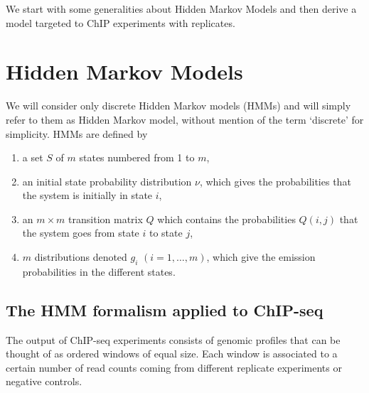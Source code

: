 \documentclass[12pt]{article}
\begin{document}
{}





\newpage
\begin{appendices}



We start with some generalities about Hidden Markov Models and then
derive a model targeted to ChIP experiments with replicates.

\section{Hidden Markov Models}

    We will consider only discrete Hidden Markov models (HMMs) and
    will simply refer to them as Hidden Markov model, without mention
    of the term `discrete' for simplicity.  HMMs are defined by

    \begin{enumerate}
      \item a set $S$ of $m$ states numbered from 1 to $m$,
      \item an initial state probability distribution $\nu$, which
      gives the probabilities that the system is initially in state $i$,
      \item an $m \times m$ transition matrix $Q$ which contains the
      probabilities $Q(i,j)$ that the system goes from state $i$ to
      state $j$,
      \item $m$ distributions denoted $g_i$ $(i = 1, \ldots, m)$, which
      give the emission probabilities in the different states.
    \end{enumerate}

\subsection{The HMM formalism applied to ChIP-seq}
\label{sec:HMM_formalism}

    The output of ChIP-seq experiments consists of genomic profiles
    that can be thought of as ordered windows of equal size. Each
    window is associated to a certain number of read counts coming
    from different replicate experiments or negative controls.


\end{appendices}
\end{document}
